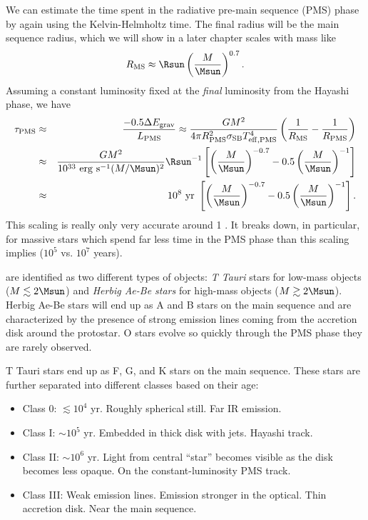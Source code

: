 We can estimate the time spent in the radiative pre-main sequence (PMS) phase by again using the Kelvin-Helmholtz time.
The final radius will be the main sequence radius, which we will show in a later chapter scales with mass like
\[R_\mathrm{MS} \approx \Rsun \left(\frac{M}{\Msun}\right)^{0.7}.\]
Assuming a constant luminosity fixed at the {\it final} luminosity from the Hayashi phase, we have
\begin{eqnarray}
  \tau_\mathrm{PMS} &\approx& \frac{-0.5\Delta E_\mathrm{grav}}{L_\mathrm{PMS}}
  \approx \frac{G M^2}{4\pi R_\mathrm{PMS}^2 \sigma_\mathrm{SB} T_\mathrm{eff,PMS}^4} \left (\frac{1}{R_\mathrm{MS}} - \frac{1}{R_\mathrm{PMS}}\right) \nonumber\\
  &\approx& \frac{G M^2}{10^{33}\ \mathrm{erg\ s^{-1}} (M/\Msun)^2} \Rsun^{-1} \left [\left(\frac{M}{\Msun}\right)^{-0.7} - 0.5\left(\frac{M}{\Msun}\right)^{-1}\right]\nonumber\\
  &\approx& 10^8\ \mathrm{yr}\ \left [\left(\frac{M}{\Msun}\right)^{-0.7} - 0.5\left(\frac{M}{\Msun}\right)^{-1}\right].
\end{eqnarray}
This scaling is really only very accurate around 1 \Msun.
It breaks down, in particular, for massive stars which spend far less time in the PMS phase than this scaling implies ($10^5$ vs. $10^7$ years).

 are identified as two different types of objects: {\it T Tauri} stars for low-mass objects ($M\lesssim2\Msun$) and {\it Herbig Ae-Be stars} for high-mass objects ($M\gtrsim2\Msun$).
Herbig Ae-Be stars will end up as A and B stars on the main sequence and are characterized by the presence of strong emission lines coming from the accretion disk around the protostar.
O stars evolve so quickly through the PMS phase they are rarely observed.

T Tauri stars end up as F, G, and K stars on the main sequence.
These stars are further separated into different classes based on their age:
\begin{itemize}
  \item Class 0: $\lesssim 10^4$ yr. Roughly spherical still. Far IR emission.
  \item Class I: $\sim10^5$ yr. Embedded in thick disk with jets. Hayashi track.
  \item Class II: $\sim10^6$ yr. Light from central ``star'' becomes visible as the disk becomes less opaque. On the constant-luminosity PMS track.
  \item Class III: Weak emission lines. Emission stronger in the optical. Thin accretion disk. Near the main sequence.
\end{itemize}

